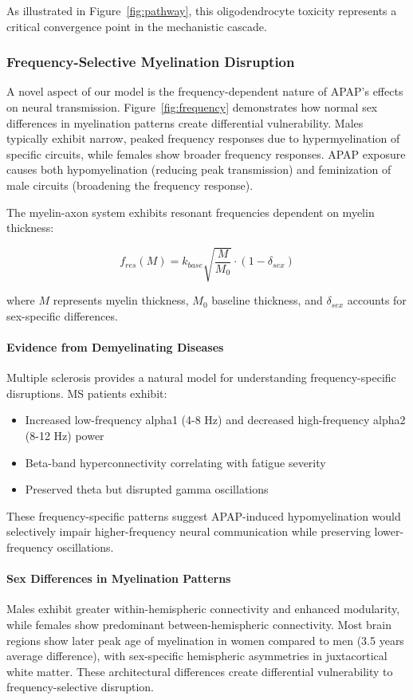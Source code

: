 \documentclass[12pt]{article}
\begin{document}
As illustrated in Figure~\ref{fig:pathway}, this oligodendrocyte toxicity represents a critical convergence point in the mechanistic cascade.

\subsubsection{Frequency-Selective Myelination Disruption}
A novel aspect of our model is the frequency-dependent nature of APAP's effects on neural transmission. Figure~\ref{fig:frequency} demonstrates how normal sex differences in myelination patterns create differential vulnerability. Males typically exhibit narrow, peaked frequency responses due to hypermyelination of specific circuits, while females show broader frequency responses. APAP exposure causes both hypomyelination (reducing peak transmission) and feminization of male circuits (broadening the frequency response).

The myelin-axon system exhibits resonant frequencies dependent on myelin thickness:

\begin{equation}
f_{res}(M) = k_{base} \sqrt{\frac{M}{M_0}} \cdot \left(1 - \delta_{sex}\right)
\end{equation}

where $M$ represents myelin thickness, $M_0$ baseline thickness, and $\delta_{sex}$ accounts for sex-specific differences.

\paragraph{Evidence from Demyelinating Diseases}
Multiple sclerosis provides a natural model for understanding frequency-specific disruptions. MS patients exhibit:
\begin{itemize}
\item Increased low-frequency alpha1 (4-8 Hz) and decreased high-frequency alpha2 (8-12 Hz) power
\item Beta-band hyperconnectivity correlating with fatigue severity  
\item Preserved theta but disrupted gamma oscillations
\end{itemize}

These frequency-specific patterns suggest APAP-induced hypomyelination would selectively impair higher-frequency neural communication while preserving lower-frequency oscillations.

\paragraph{Sex Differences in Myelination Patterns}
Males exhibit greater within-hemispheric connectivity and enhanced modularity, while females show predominant between-hemispheric connectivity. Most brain regions show later peak age of myelination in women compared to men (3.5 years average difference), with sex-specific hemispheric asymmetries in juxtacortical white matter. These architectural differences create differential vulnerability to frequency-selective disruption.
\end{document}
